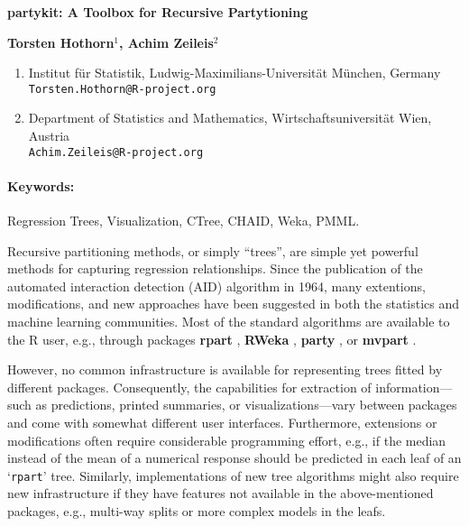 \documentclass[10pt]{article}
\renewcommand{\title}[1]{\begin{center}{\bf \LARGE #1}\end{center}}
\newcommand{\keywords}{\paragraph{Keywords:}}
\let\code=\texttt
\let\pkg=\textbf
\let\proglang=\textsf
\newcommand{\class}[1]{`\code{#1}'}
\begin{document}
\pagestyle{empty}

\title{\pkg{partykit}: A Toolbox for Recursive Partytioning}

\begin{center}
  {\bf Torsten Hothorn$^{1}$, Achim Zeileis$^{2}$}
\end{center}

\begin{affiliations}
\begin{enumerate}
  \item Institut f\"ur Statistik, Ludwig-Maximilians-Universit\"at M\"unchen, Germany\\
        \texttt{Torsten.Hothorn@R-project.org}
  \item Department of Statistics and Mathematics, Wirtschaftsuniversit\"at Wien, Austria\\
        \texttt{Achim.Zeileis@R-project.org}
\end{enumerate}
\end{affiliations}

\keywords Regression Trees, Visualization, CTree, CHAID, Weka, PMML.

\vskip 0.8cm

Recursive partitioning methods, or simply ``trees'', are simple yet powerful
methods for capturing regression relationships. Since the publication of the
automated interaction detection (AID) algorithm in 1964, many extentions,
modifications, and new approaches have been suggested in both the statistics
and machine learning communities. Most of the standard algorithms are
available to the \proglang{R} user, e.g., through packages
\pkg{rpart} \citep{partykit:rpart},
\pkg{RWeka} \citep{partykit:RWeka},
\pkg{party} \citep{partykit:party}, or
\pkg{mvpart} \citep{partykit:mvpart}.

However, no common infrastructure is available for representing trees
fitted by different packages. Consequently, the capabilities for extraction of
information---such as predictions, printed summaries, or visualizations---vary
between packages and come with somewhat different user interfaces.
Furthermore, extensions or modifications often require considerable
programming effort, e.g., if the median instead of the mean of a numerical
response should be predicted in each leaf of an \class{rpart} tree.
Similarly, implementations of new tree algorithms might also require new
infrastructure if they have features not available in the above-mentioned
packages, e.g., multi-way splits or more complex models in the leafs.
\end{document}
